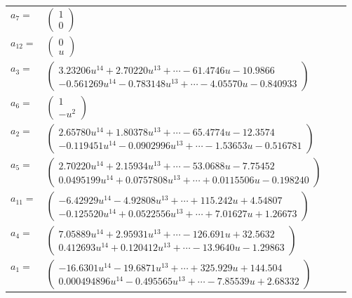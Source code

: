 \documentclass[1p]{elsarticle_modified}
\theoremstyle{definition}
\begin{document}
\begin{tabular}{m{7pt} m{180pt} m{7pt} m{180pt} }
\flushright $a_{7}=$&$\begin{pmatrix}1\\0\end{pmatrix}$ \\
\flushright $a_{12}=$&$\begin{pmatrix}0\\u\end{pmatrix}$ \\
\flushright $a_{3}=$&$\begin{pmatrix}3.23206 u^{14}+2.70220 u^{13}+\cdots-61.4746 u-10.9866\\-0.561269 u^{14}-0.783148 u^{13}+\cdots-4.05570 u-0.840933\end{pmatrix}$ \\
\flushright $a_{6}=$&$\begin{pmatrix}1\\- u^2\end{pmatrix}$ \\
\flushright $a_{2}=$&$\begin{pmatrix}2.65780 u^{14}+1.80378 u^{13}+\cdots-65.4774 u-12.3574\\-0.119451 u^{14}-0.0902996 u^{13}+\cdots-1.53653 u-0.516781\end{pmatrix}$ \\
\flushright $a_{5}=$&$\begin{pmatrix}2.70220 u^{14}+2.15934 u^{13}+\cdots-53.0688 u-7.75452\\0.0495199 u^{14}+0.0757808 u^{13}+\cdots+0.0115506 u-0.198240\end{pmatrix}$ \\
\flushright $a_{11}=$&$\begin{pmatrix}-6.42929 u^{14}-4.92808 u^{13}+\cdots+115.242 u+4.54807\\-0.125520 u^{14}+0.0522556 u^{13}+\cdots+7.01627 u+1.26673\end{pmatrix}$ \\
\flushright $a_{4}=$&$\begin{pmatrix}7.05889 u^{14}+2.95931 u^{13}+\cdots-126.691 u+32.5632\\0.412693 u^{14}+0.120412 u^{13}+\cdots-13.9640 u-1.29863\end{pmatrix}$ \\
\flushright $a_{1}=$&$\begin{pmatrix}-16.6301 u^{14}-19.6871 u^{13}+\cdots+325.929 u+144.504\\0.000494896 u^{14}-0.495565 u^{13}+\cdots-7.85539 u+2.68332\end{pmatrix}$ \\

\end{tabular}
\end{document}
